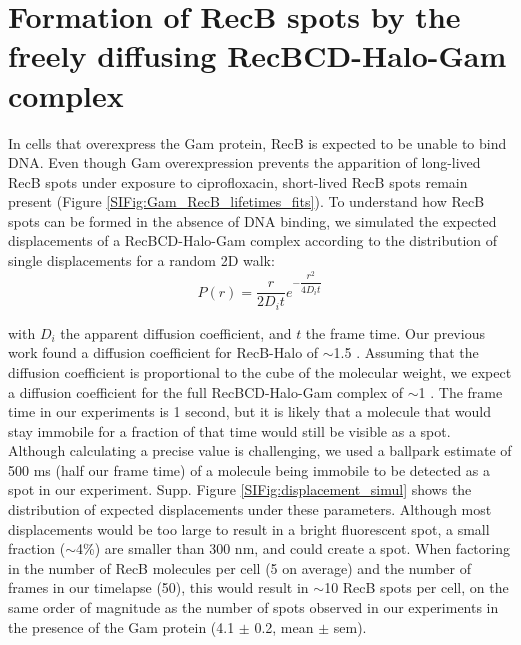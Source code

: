 \section{Formation of RecB spots by the freely diffusing RecBCD-Halo-Gam complex}
\label{note:spurious_spots}
In cells that overexpress the Gam protein, RecB is expected to be unable to bind DNA. Even though Gam overexpression prevents the apparition of long-lived RecB spots under exposure to ciprofloxacin, short-lived RecB spots remain present (Figure \ref{SIFig:Gam_RecB_lifetimes_fits}). To understand how RecB spots can be formed in the absence of DNA binding, we simulated the expected displacements of a RecBCD-Halo-Gam complex according to the distribution of single displacements for a random 2D walk:
\begin{equation}
    P(r) = \dfrac{r}{2D_i t}e^{-\dfrac{r^2}{4D_i t}}
\end{equation}

with $D_i$ the apparent diffusion coefficient, and $t$ the frame time. Our previous work found a diffusion coefficient for RecB-Halo of $\sim$1.5 \ums.\cite{Lepore2023} Assuming that the diffusion coefficient is proportional to the cube of the molecular weight, we expect a diffusion coefficient for the full RecBCD-Halo-Gam complex of $\sim$1 \ums. The frame time in our experiments is 1 second, but it is likely that a molecule that would stay immobile for a fraction of that time would still be visible as a spot. Although calculating a precise value is challenging, we used a ballpark estimate of 500 ms (half our frame time) of a molecule being immobile to be detected as a spot in our experiment. Supp. Figure \ref{SIFig:displacement_simul} shows the distribution of expected displacements under these parameters. Although most displacements would be too large to result in a bright fluorescent spot, a small fraction ($\sim$4\%) are smaller than 300 nm, and could create a spot. When factoring in the number of RecB molecules per cell (5 on average) and the number of frames in our timelapse (50), this would result in $\sim$10 RecB spots per cell, on the same order of magnitude as the number of spots observed in our experiments in the presence of the Gam protein (4.1 $\pm$ 0.2, mean $\pm$ sem).

\clearpage

\setlength\intextsep{40pt}



